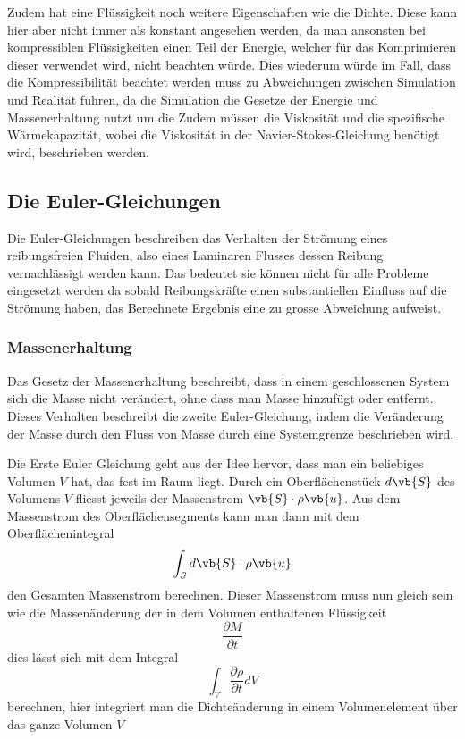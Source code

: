 Zudem hat eine Flüssigkeit noch weitere Eigenschaften wie die Dichte. 
Diese kann hier aber nicht immer als konstant angesehen werden, da man ansonsten bei kompressiblen Flüssigkeiten einen Teil der Energie, welcher für das Komprimieren dieser verwendet wird, nicht beachten würde.
Dies wiederum würde im Fall, dass die Kompressibilität beachtet werden muss zu Abweichungen zwischen Simulation und Realität führen, da die Simulation die Gesetze der Energie und Massenerhaltung nutzt um die 
Zudem müssen die Viskosität und die spezifische Wärmekapazität, wobei die Viskosität in der Navier-Stokes-Gleichung benötigt wird, beschrieben werden.

\subsection{Die Euler-Gleichungen}
Die Euler-Gleichungen beschreiben das Verhalten der Strömung eines reibungsfreien Fluiden, also eines Laminaren Flusses dessen Reibung vernachlässigt werden kann. 
Das bedeutet sie können nicht für alle Probleme eingesetzt werden da sobald Reibungskräfte einen substantiellen Einfluss auf die Strömung haben, das Berechnete Ergebnis eine zu grosse Abweichung aufweist.

\subsubsection{Massenerhaltung}
Das Gesetz der Massenerhaltung beschreibt, dass in einem geschlossenen System sich die Masse nicht verändert, ohne dass man Masse hinzufügt oder entfernt. 
Dieses Verhalten beschreibt die zweite Euler-Gleichung, indem die Veränderung der Masse durch den Fluss von Masse durch eine Systemgrenze beschrieben wird.

Die Erste Euler Gleichung geht aus der Idee hervor, dass man ein beliebiges Volumen $V$ hat, das fest im Raum liegt. Durch ein Oberflächenstück 
$d \vb{S} $ 
des Volumens 
$V$
 fliesst jeweils der Massenstrom 
$\vb{S} \cdot\rho\vb{u}$.
Aus dem Massenstrom des Oberflächensegments kann man dann mit dem Oberflächenintegral 
\[\int_{S}d\vb{S}\cdot\rho\vb{u}\]
den Gesamten Massenstrom berechnen. Dieser Massenstrom muss nun gleich sein wie die Massenänderung der in dem Volumen enthaltenen Flüssigkeit 
\[\frac{\partial M}{\partial t}\]
dies lässt sich mit dem Integral 
\[\int_{V}\frac{\partial \rho}{\partial t} dV\]
berechnen, hier integriert man die Dichteänderung in einem Volumenelement über das ganze Volumen 
$V$ 

